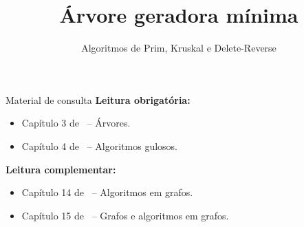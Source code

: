 \newcommand{\defs}{../defs}


\title[Árvore geradora mínima]{Árvore geradora mínima}
\subtitle{Algoritmos de Prim, Kruskal e Delete-Reverse}



\maketitle

\begin{frame}{Material de consulta}
	\textbf{Leitura obrigatória:}
	\begin{itemize}
		\item Capítulo 3 de~\cite{Goldbarg2AndGoldbarg2012} -- Árvores.
		\item Capítulo 4 de~\cite{KleinbergAndTardos2006} -- Algoritmos gulosos.
	\end{itemize}
	
	\bigskip
	
	\textbf{Leitura complementar:}
	\begin{itemize}
		\item Capítulo 14 de~\cite{GoodrichEtAl2014} -- Algoritmos em grafos.
		\item Capítulo 15 de~\cite{Preiss2001} -- Grafos e algoritmos em grafos.
	\end{itemize}
\end{frame}


